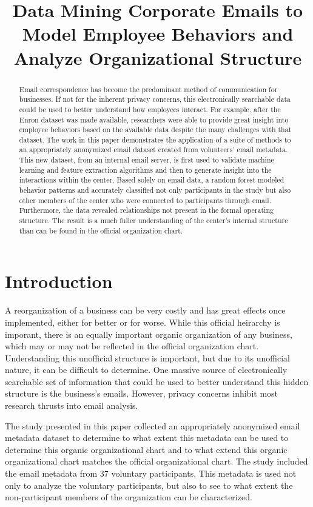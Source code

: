 \documentclass{article}
\begin{document}
\title{Data Mining Corporate Emails to Model Employee Behaviors and Analyze Organizational Structure}
\maketitle

\begin{abstract}
Email correspondence has become the predominant method of communication for businesses.  If not for the inherent privacy concerns, this electronically searchable data could be used to better understand how employees interact. For example, after the Enron dataset was made available, researchers were able to provide great insight into employee behaviors based on the available data despite the many challenges with that dataset.  The work in this paper demonstrates the application of a suite of methods to an appropriately anonymized email dataset created from volunteers' email metadata.  This new dataset, from an internal email server, is first used to validate machine learning and feature extraction algorithms and then to generate insight into the interactions within the center.  Based solely on email data, a random forest  modeled behavior patterns and accurately classified not only participants in the study but also other members of the center who were connected to participants through email.  Furthermore, the data revealed relationships not present in the formal operating structure.  The result is a much fuller understanding of the center's internal structure than can be found in the official organization chart.
\end{abstract}

\section{Introduction}
A reorganization of a business can be very costly and has great effects once implemented, either for better or for worse.  While this official heirarchy is imporant, there is an equally important organic organization of any business, which may or may not be reflected in the official organization chart.  Understanding this unofficial structure is important, but due to its unofficial nature, it can be difficult to determine.  One massive source of electronically searchable set of information that could be used to better understand this hidden structure is the business's emails.  However, privacy concerns inhibit most research thrusts into email analysis.  

The study presented in this paper collected an appropriately anonymized email metadata dataset to determine to what extent this metadata can be used to determine this organic organizational chart and to what extend this organic organizational chart matches the official organizational chart.  The study included the email metadata from 37 voluntary participants.  This metadata is used not only to analyze the voluntary participants, but also to see to what extent the non-participant members of the organization can be characterized.
\end{document}
